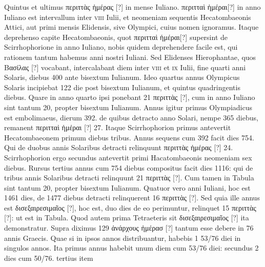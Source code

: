 Quintus et ultimus
\textgreek{περιττὰς ἡμέρας [?]} in mense Iuliano.
\textgreek{περιτταὶ ἡμέραι[?]} in anno Iuliano
est intervallum inter \textsc{viii} Iulii, et neomeniam sequentis Hecatombaeonis
Attici, aut primi mensis Elidensis, sive Olympici, cuius nomen
ignoramus.
Itaque deprehenso capite Hecatombaeonis, quot
\textgreek{περιτταὶ ἡμέραι[?]} supersint de Scirrhophorione in anno Iuliano,
 nobis quidem
deprehendere facile est, qui rationem tantum habemus anni nostri
Iuliani.
Sed Elidenses Hierophantae, quos \textgreek{Βασίλας [?]} vocabant,
intercalabant
diem inter \textsc{viii} et \textsc{ix} Iulii, fine quarti anni Solaris, diebus
400 ante bisextum Iulianum.
Ideo quartus annus Olympicus Solaris
incipiebat 122 die post bisextum Iulianum, et quintus quadringentis
diebus.
Quare in anno quarto ipsi ponebant 21 \textgreek{περιττὰς [?]}, cum in
anno Iuliano sint tantum 20, propter bisextum Iulianum.
Annus igitur
primus Olympiadicus est embolimaeus, dierum 392. de quibus
detracto anno Solari, nempe 365 diebus, remanent
 \textgreek{περιτταὶ ἡμέραι [?]} 27.
Itaque Scirrhophorion primus antevertit Hecatombaeonem primum
diebus tribus.
Annus sequens cum 392 facit dies 754.
Qui de duobus
annis Solaribus detracti relinquunt \textgreek{περιττὰς ἡμέρας [?]} 24.
Scirrhophorion
ergo secundus antevertit primi Hacatombaeonis neomeniam sex diebus.
Rursus tertius annus cum 754 diebus compositus facit dies 1116: qui
de tribus annis Solaribus detracti relinquunt 21 \textgreek{περιττὰς [?]}.
Cum tamen in
Tabula sint tantum 20, propter bisextum Iulianum.
Quatuor vero anni
Iuliani, hoc est 1461 dies, de 1477 diebus detracti relinquerent 16
\textgreek{περιττὰς [?]}.
Sed quia ille annus est \textgreek{δισεξαιρεσιμαῖος [?]}, hoc est,
 duo dies de eo
perimuntur, relinquet 15 \textgreek{περιττὰς [?]}: ut est in Tabula.
Quod autem prima
Tetraeteris sit \textgreek{δισεξαιρεσιμαῖος [?]} ita demonstratur.
Supra diximus 129
\textgreek{ἀνάρχους ἡμέρασ [?]} tantum esse debere in 76 annis Graecis.
Quae si in ipsos
annos distribuantur, habebis 1 53/76 diei in singulos annos.
Ita primus annus
habebit unum diem cum 53/76 diei: secundus 2 dies cum 50/76. tertius item
